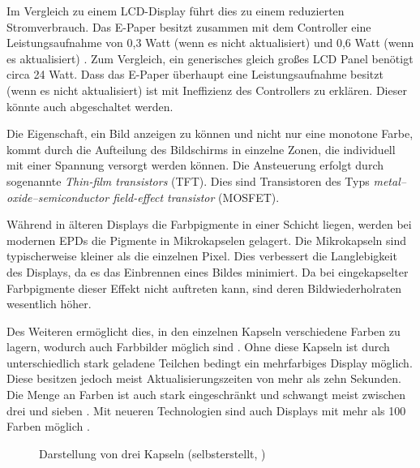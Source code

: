 \documentclass[10pt]{article}
\begin{document}
Im Vergleich zu einem LCD-Display führt dies zu einem reduzierten Stromverbrauch. Das E-Paper besitzt zusammen mit dem Controller eine Leistungsaufnahme von 0,3 Watt (wenn es nicht aktualisiert) und 0,6 Watt (wenn es aktualisiert) \cite{ourepd}. Zum Vergleich, ein generisches gleich großes LCD Panel benötigt circa 24 Watt\cite{LCD}.
Dass das E-Paper überhaupt eine Leistungsaufnahme besitzt (wenn es nicht aktualisiert) ist mit Ineffizienz des Controllers zu erklären. Dieser könnte auch abgeschaltet werden.

Die Eigenschaft, ein Bild anzeigen zu können und nicht nur eine monotone Farbe, kommt durch die Aufteilung des Bildschirms in einzelne Zonen, die individuell mit einer Spannung versorgt werden können. Die Ansteuerung erfolgt durch sogenannte \textit{Thin-film transistors} (TFT)\cite{epaperstudy}. Dies sind Transistoren des Typs \textit{metal–oxide–semiconductor field-effect transistor} (MOSFET)\cite{TFT}.

Während in älteren Displays die Farbpigmente in einer Schicht liegen, werden bei modernen EPDs die Pigmente in Mikrokapselen gelagert. Die Mikrokapseln sind typischerweise kleiner als die einzelnen Pixel. Dies verbessert die Langlebigkeit des Displays, da es das Einbrennen eines Bildes minimiert. 
Da bei eingekapselter Farbpigmente dieser Effekt nicht auftreten kann, sind deren Bildwiederholraten wesentlich höher.

Des Weiteren ermöglicht dies, in den einzelnen Kapseln verschiedene Farben zu lagern, wodurch auch Farbbilder möglich sind \cite{KHOLGHIESHKALAK201938}. Ohne diese Kapseln ist durch unterschiedlich stark geladene Teilchen bedingt ein mehrfarbiges Display möglich. Diese besitzen jedoch meist Aktualisierungszeiten von mehr als zehn Sekunden. Die Menge an Farben ist auch stark eingeschränkt und schwangt meist zwischen drei und sieben \cite{multicolorepd}. Mit neueren Technologien sind auch Displays mit mehr als 100 Farben möglich \cite{colortechepd}.
\begin{figure}[H]
  \centerline{}
  \caption{Darstellung von drei Kapseln (selbsterstellt, )}
  \label{Mikrokapsel}
\end{figure}
\end{document}
